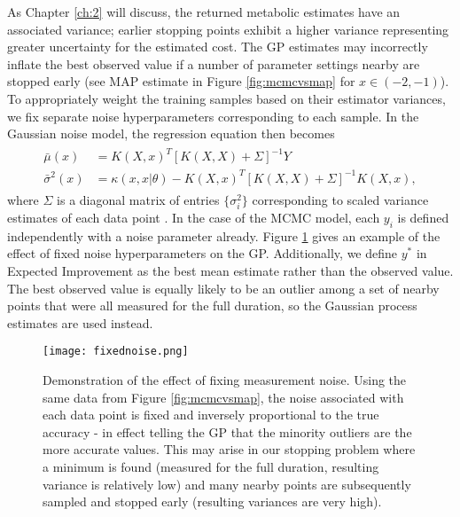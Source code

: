 As Chapter \ref{ch:2} will discuss, the returned metabolic estimates have an associated variance; earlier stopping points exhibit a higher variance representing greater uncertainty for the estimated cost. The GP estimates may incorrectly inflate the best observed value if a number of parameter settings nearby are stopped early (see MAP estimate in Figure \ref{fig:mcmcvsmap} for $x\in(-2, -1)$). To appropriately weight the training samples based on their estimator variances, we fix separate noise hyperparameters corresponding to each sample. In the Gaussian noise model, the regression equation then becomes
\begin{align}
\begin{split}
  \bar{\mu}(x) &= K(X, x)^T[K(X, X) + \Sigma]^{-1}Y \\
  \bar{\sigma}^2(x) &= \kappa(x, x\vert \theta) - K(X, x)^T[K(X,X) + \Sigma]^{-1}K(X,x),
\end{split}
\end{align}
where $\Sigma$ is a diagonal matrix of entries $\{\sigma_i^2\}$ corresponding to scaled variance estimates of each data point \citep{Kersting:2007:MLH:1273496.1273546}. In the case of the MCMC model, each $y_i$ is defined independently with a noise parameter already. Figure \ref{fig:fixednoise} gives an example of the effect of fixed noise hyperparameters on the GP. Additionally, we define $y^*$ in Expected Improvement as the best mean estimate rather than the observed value. The best observed value is equally likely to be an outlier among a set of nearby points that were all measured for the full duration, so the Gaussian process estimates are used instead.

\begin{figure}[t]
\texttt{[image: fixednoise.png]}
\caption{Demonstration of the effect of fixing measurement noise. Using the same data from Figure \ref{fig:mcmcvsmap}, the noise associated with each data point is fixed and inversely proportional to the true accuracy - in effect telling the GP that the minority outliers are the more accurate values. This may arise in our stopping problem where a minimum is found (measured for the full duration, resulting variance is relatively low) and many nearby points are subsequently sampled and stopped early (resulting variances are very high).}
\label{fig:fixednoise}
\end{figure}